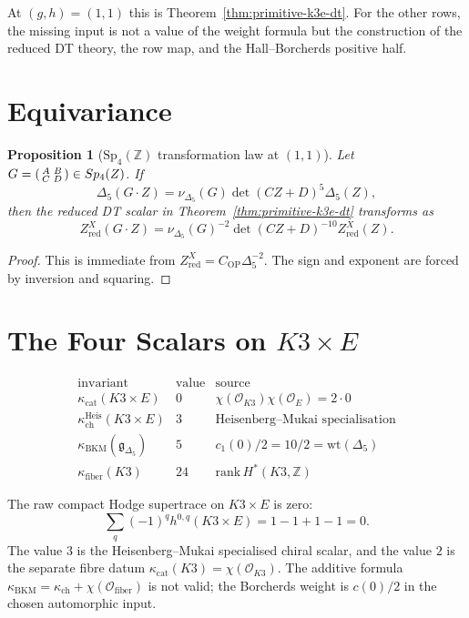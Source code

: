 \documentclass[11pt]{article}
\newtheorem{proposition}[theorem]{Proposition}
\theoremstyle{definition}
\providecommand{\Z}{\mathbb{Z}}
\providecommand{\cO}{\mathcal{O}}
\providecommand{\Sp}{\mathrm{Sp}}
\providecommand{\fg}{\mathfrak{g}}
\providecommand{\kch}{\kappa_{\mathrm{ch}}}
\providecommand{\kcat}{\kappa_{\mathrm{cat}}}
\providecommand{\kBKM}{\kappa_{\mathrm{BKM}}}
\providecommand{\kfib}{\kappa_{\mathrm{fiber}}}
\begin{document}
At $(g,h)=(1,1)$ this is Theorem~\ref{thm:primitive-k3e-dt}. For the
other rows, the missing input is not a value of the weight formula but
the construction of the reduced DT theory, the row map, and the
Hall--Borcherds positive half.

\section{Equivariance}
\label{sec:equivariance}

\begin{proposition}[$\Sp_4(\Z)$ transformation law at $(1,1)$]
\label{prop:sp4-equivariance}
Let $G=\begin{psmallmatrix}A&B\\ C&D\end{psmallmatrix}\in\Sp_4(\Z)$.
If
\[
 \Delta_5(G\cdot Z)=\nu_{\Delta_5}(G)\det(CZ+D)^5\Delta_5(Z),
\]
then the reduced DT scalar in Theorem~\ref{thm:primitive-k3e-dt}
transforms as
\[
 Z^X_{\mathrm{red}}(G\cdot Z)
 =\nu_{\Delta_5}(G)^{-2}\det(CZ+D)^{-10}
 Z^X_{\mathrm{red}}(Z).
\]
\end{proposition}

\begin{proof}
This is immediate from $Z^X_{\mathrm{red}}=C_{\mathrm{OP}}\Delta_5^{-2}$.
The sign and exponent are forced by inversion and squaring.
\end{proof}

\section{The Four Scalars on $K3\times E$}
\label{sec:four-scalars}

\[
\begin{array}{c|c|l}
\text{invariant} & \text{value} & \text{source}\\
\hline
\kcat(K3\times E) & 0 &
\chi(\cO_{K3})\chi(\cO_E)=2\cdot 0\\
\kch^{\mathrm{Heis}}(K3\times E) & 3 &
\text{Heisenberg--Mukai specialisation}\\
\kBKM(\fg_{\Delta_5}) & 5 &
c_1(0)/2=10/2=\mathrm{wt}(\Delta_5)\\
\kfib(K3) & 24 &
\mathrm{rank}\,H^\ast(K3,\Z)
\end{array}
\]

The raw compact Hodge supertrace on $K3\times E$ is zero:
\[
 \sum_q(-1)^qh^{0,q}(K3\times E)=1-1+1-1=0.
\]
The value $3$ is the Heisenberg--Mukai specialised chiral scalar, and
the value $2$ is the separate fibre datum
$\kcat(K3)=\chi(\cO_{K3})$. The additive formula
$\kBKM=\kch+\chi(\cO_{\mathrm{fiber}})$ is not valid; the Borcherds
weight is $c(0)/2$ in the chosen automorphic input.
\end{document}
